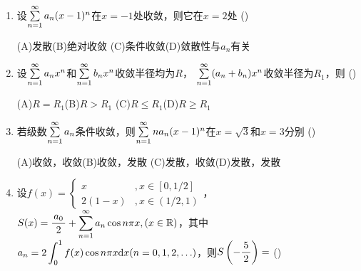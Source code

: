 \begin{enumerate}
  (A)$1$\hspace{1cm}(B)$-1$\hspace{1cm}
  (C)$2$\hspace{1cm}(D)$-2$
  \item 设$\sum\limits_{n=1}^{\infty} a_n(x-1)^n$在$x=-1$处收敛，则它在$x=2$处
  (\underline{\hspace{1cm}})
  
  (A)发散\hspace{1cm}(B)绝对收敛\hspace{1cm}
  (C)条件收敛\hspace{1cm}(D)敛散性与$a_n$有关
  \item 设$\sum\limits_{n=1}^{\infty} a_nx^n$和$\sum\limits_{n=1}^{\infty} b_nx^n$收敛半径均为$R$，
  $\sum\limits_{n=1}^{\infty}(a_n+b_n)x^n$收敛半径为$R_1$，则
  (\underline{\hspace{1cm}})
  
  (A)$R=R_1$\hspace{1cm}(B)$R>R_1$\hspace{1cm}
  (C)$R\leq R_1$\hspace{1cm}(D)$R\geq R_1$
  \item 若级数$\sum\limits_{n=1}^{\infty} a_n$条件收敛，则$\sum\limits_{n=1}^{\infty} na_n(x-1)^n$在$x=\sqrt3$和$x=3$分别
  (\underline{\hspace{1cm}})
  
  (A)收敛，收敛\hspace{1cm}(B)收敛，发散\hspace{1cm}
  (C)发散，收敛\hspace{1cm}(D)发散，发散
  \item 设$f(x)=\left\{\begin{array}{ll}
  x&,x\in[0,1/2]\\ 2(1-x)&,x\in(1/2,1)
  \end{array}\right.$，$S(x)=\displaystyle\frac{\,{a_0}\,}{\,{2}\,}+\sum\limits_{n=1}^{\infty} a_n\cos n\pi x,
  (x\in\mathbb{R})$，其中$a_n=2\displaystyle\int_0^1f(x)\cos n\pi x\mathrm{d} x
  (n=0,1,2,\ldots)$，则$S\left(-\displaystyle\frac{\,{5}\,}{\,{2}\,}\right)=$
  (\underline{\hspace{1cm}})
  

\end{enumerate}

